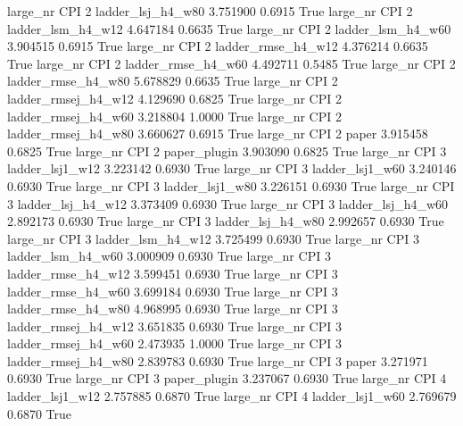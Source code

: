   large_nr      CPI                 2   ladder_lsj_h4_w80    3.751900      0.6915    True
  large_nr      CPI                 2   ladder_lsm_h4_w12    4.647184      0.6635    True
  large_nr      CPI                 2   ladder_lsm_h4_w60    3.904515      0.6915    True
  large_nr      CPI                 2  ladder_rmse_h4_w12    4.376214      0.6635    True
  large_nr      CPI                 2  ladder_rmse_h4_w60    4.492711      0.5485    True
  large_nr      CPI                 2  ladder_rmse_h4_w80    5.678829      0.6635    True
  large_nr      CPI                 2 ladder_rmsej_h4_w12    4.129690      0.6825    True
  large_nr      CPI                 2 ladder_rmsej_h4_w60    3.218804      1.0000    True
  large_nr      CPI                 2 ladder_rmsej_h4_w80    3.660627      0.6915    True
  large_nr      CPI                 2               paper    3.915458      0.6825    True
  large_nr      CPI                 2        paper_plugin    3.903090      0.6825    True
  large_nr      CPI                 3     ladder_lsj1_w12    3.223142      0.6930    True
  large_nr      CPI                 3     ladder_lsj1_w60    3.240146      0.6930    True
  large_nr      CPI                 3     ladder_lsj1_w80    3.226151      0.6930    True
  large_nr      CPI                 3   ladder_lsj_h4_w12    3.373409      0.6930    True
  large_nr      CPI                 3   ladder_lsj_h4_w60    2.892173      0.6930    True
  large_nr      CPI                 3   ladder_lsj_h4_w80    2.992657      0.6930    True
  large_nr      CPI                 3   ladder_lsm_h4_w12    3.725499      0.6930    True
  large_nr      CPI                 3   ladder_lsm_h4_w60    3.000909      0.6930    True
  large_nr      CPI                 3  ladder_rmse_h4_w12    3.599451      0.6930    True
  large_nr      CPI                 3  ladder_rmse_h4_w60    3.699184      0.6930    True
  large_nr      CPI                 3  ladder_rmse_h4_w80    4.968995      0.6930    True
  large_nr      CPI                 3 ladder_rmsej_h4_w12    3.651835      0.6930    True
  large_nr      CPI                 3 ladder_rmsej_h4_w60    2.473935      1.0000    True
  large_nr      CPI                 3 ladder_rmsej_h4_w80    2.839783      0.6930    True
  large_nr      CPI                 3               paper    3.271971      0.6930    True
  large_nr      CPI                 3        paper_plugin    3.237067      0.6930    True
  large_nr      CPI                 4     ladder_lsj1_w12    2.757885      0.6870    True
  large_nr      CPI                 4     ladder_lsj1_w60    2.769679      0.6870    True
